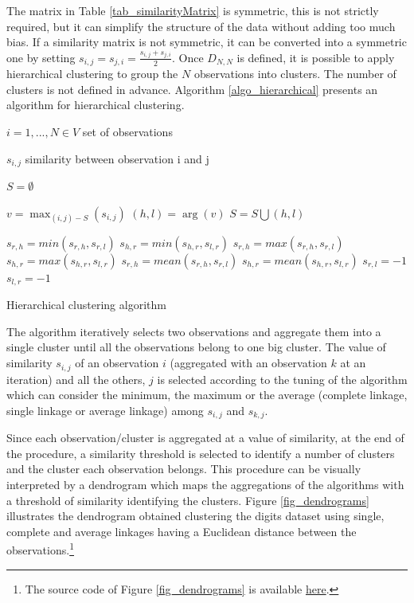 The matrix in Table \ref{tab_similarityMatrix} is symmetric, this is not strictly required, but it can simplify the structure of the data without adding too much bias. If a similarity matrix is not symmetric, it can be converted into a symmetric one by setting $s_{i,j}=s_{j,i}=\frac{s_{i,j}+s_{j,i}}{2}$. Once $D_{N,N}$ is defined, it is possible to apply hierarchical clustering to group the $N$ observations into clusters. The number of clusters is not defined in advance. Algorithm \ref{algo_hierarchical} presents an algorithm for hierarchical clustering.

\begin{algorithm}[H]
\DontPrintSemicolon
\SetAlgoLined
    
    $i=1,...,N \in V$ set of observations \;
    
    $s_{i,j}$ similarity between observation i and j \;
    
    $S= \emptyset $ \;
    {
    $v =\max_{(i,j)-S}{(s_{i,j})}$ \;
    $(h,l)=\arg(v)$\;
    $S= S \bigcup (h,l)$ \;
    {
     {
    $s_{r,h}=min(s_{r,h},s_{r,l})$\;
    $s_{h,r}=min(s_{h,r},s_{l,r})$\;
    }
     {
    $s_{r,h}=max(s_{r,h},s_{r,l})$\;
    $s_{h,r}=max(s_{h,r},s_{l,r})$\;
    }
     {
    $s_{r,h}=mean(s_{r,h},s_{r,l})$\;
    $s_{h,r}=mean(s_{h,r},s_{l,r})$\;
    }
    $s_{r,l}=-1$\;
    $s_{l,r}=-1$\;
    
    }
    }
\caption{Hierarchical clustering algorithm}
\label{algo_hierarchical}        
\end{algorithm}

The algorithm iteratively selects two observations and aggregate them into a single cluster until all the observations belong to one big cluster. The value of similarity $s_{i,j}$ of an observation $i$ (aggregated with an observation $k$ at an iteration) and all the others, $j$ is selected according to the tuning of the algorithm which can consider the minimum, the maximum or the average (complete linkage, single linkage or average linkage) among $s_{i,j}$ and $s_{k,j}$.\par

Since each observation/cluster is aggregated at a value of similarity, at the end of the procedure, a similarity threshold is selected to identify a number of clusters and the cluster each observation belongs. This procedure can be visually interpreted by a dendrogram which maps the aggregations of the algorithms with a threshold of similarity identifying the clusters. Figure \ref{fig_dendrograms} illustrates the dendrogram obtained clustering the digits dataset using single, complete and average linkages having a Euclidean distance between the observations.\footnote{The source code of Figure \ref{fig_dendrograms} is available \href{https://github.com/aletuf93/logproj/blob/master/examples/06.\%20Unsupervised\%20learning.ipynb}{here}.}

